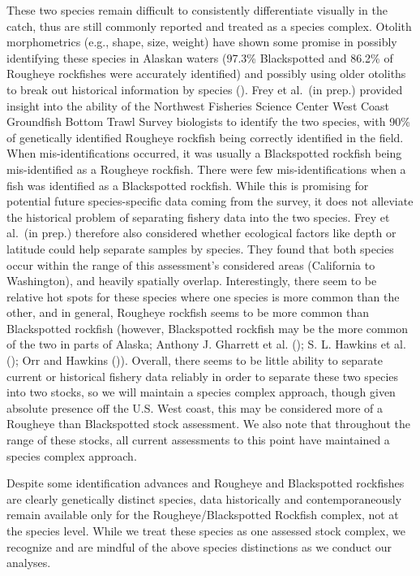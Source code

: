 \documentclass[
]{scrartcl}
\begin{document}
These two species remain difficult to consistently differentiate
visually in the catch, thus are still commonly reported and treated as a
species complex. Otolith morphometrics (e.g., shape, size, weight) have
shown some promise in possibly identifying these species in Alaskan
waters (97.3\% Blackspotted and 86.2\% of Rougheye rockfishes were
accurately identified) and possibly using older otoliths to break out
historical information by species
().
Frey et al.~(in prep.) provided insight into the ability of the
Northwest Fisheries Science Center West Coast Groundfish Bottom Trawl
Survey biologists to identify the two species, with 90\% of genetically
identified Rougheye rockfish being correctly identified in the field.
When mis-identifications occurred, it was usually a Blackspotted
rockfish being mis-identified as a Rougheye rockfish. There were few
mis-identifications when a fish was identified as a Blackspotted
rockfish. While this is promising for potential future species-specific
data coming from the survey, it does not alleviate the historical
problem of separating fishery data into the two species. Frey et al.~(in
prep.) therefore also considered whether ecological factors like depth
or latitude could help separate samples by species. They found that both
species occur within the range of this assessment's considered areas
(California to Washington), and heavily spatially overlap.
Interestingly, there seem to be relative hot spots for these species
where one species is more common than the other, and in general,
Rougheye rockfish seems to be more common than Blackspotted rockfish
(however, Blackspotted rockfish may be the more common of the two in
parts of Alaska; Anthony J. Gharrett et al.
(); S. L. Hawkins et al.
(); Orr and Hawkins
()). Overall, there seems to be
little ability to separate current or historical fishery data reliably
in order to separate these two species into two stocks, so we will
maintain a species complex approach, though given absolute presence off
the U.S. West coast, this may be considered more of a Rougheye than
Blackspotted stock assessment. We also note that throughout the range of
these stocks, all current assessments to this point have maintained a
species complex approach.

Despite some identification advances and Rougheye and Blackspotted
rockfishes are clearly genetically distinct species, data historically
and contemporaneously remain available only for the
Rougheye/Blackspotted Rockfish complex, not at the species level. While
we treat these species as one assessed stock complex, we recognize and
are mindful of the above species distinctions as we conduct our
analyses.
\end{document}
